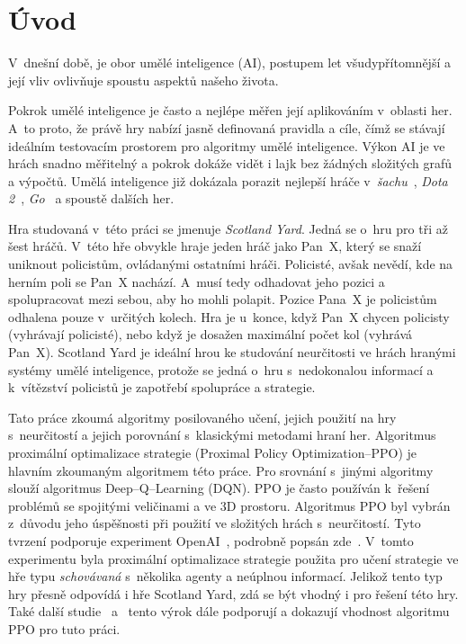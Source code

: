 \newtheorem{definition}{\textbf{Definice}}

\chapter{Úvod}
\label{ch:uvod}

V~dnešní době, je obor umělé inteligence (AI), postupem let všudypřítomnější a její vliv ovlivňuje spoustu aspektů našeho života.

Pokrok umělé inteligence je často a nejlépe měřen její aplikováním v~oblasti her.
A~to proto, že právě hry nabízí jasně definovaná pravidla a cíle, čímž se stávají ideálním testovacím prostorem pro algoritmy umělé inteligence.
Výkon AI je ve hrách snadno měřitelný a pokrok dokáže vidět i lajk bez žádných složitých grafů a výpočtů.
Umělá inteligence již dokázala porazit nejlepší hráče v~\textit{šachu}~\cite{DeepBlue}, \textit{Dota 2}~\cite{Dota2}, \textit{Go}~\cite{AlphaGo} a spoustě dalších her.

Hra studovaná v~této práci se jmenuje \emph{Scotland Yard}.
Jedná se o~hru pro tři až šest hráčů.
V~této hře obvykle hraje jeden hráč jako Pan~X, který se snaží uniknout policistům, ovládanými ostatními hráči.
Policisté, avšak nevědí, kde na herním poli se Pan~X nachází.
A~musí tedy odhadovat jeho pozici a spolupracovat mezi sebou, aby ho mohli polapit.
Pozice Pana~X je policistům odhalena pouze v~určitých kolech.
Hra je u~konce, když Pan~X chycen policisty (vyhrávají policisté), nebo když je dosažen maximální počet kol (vyhrává Pan~X).
Scotland Yard je ideální hrou ke studování neurčitosti ve hrách hranými systémy umělé inteligence, protože se jedná o~hru s~nedokonalou informací a k~vítězství policistů je zapotřebí spolupráce a strategie.

Tato práce zkoumá algoritmy posilovaného učení, jejich použití na hry s~neurčitostí a jejich porovnání s~klasickými metodami hraní her.
Algoritmus proximální optimalizace strategie (Proximal Policy Optimization--PPO) je hlavním zkoumaným algoritmem této práce.
Pro srovnání s~jinými algoritmy slouží algoritmus Deep--Q--Learning (DQN).
PPO je často používán k~řešení problémů se spojitými veličinami a ve 3D prostoru.
Algoritmus PPO byl vybrán z~důvodu jeho úspěšnosti při použití ve složitých hrách s~neurčitostí.
Tyto tvrzení podporuje experiment OpenAI~\cite{PPO_Hide_Seek_page}, podrobně popsán zde~\cite{PPO_Hide_Seek_paper}.
V~tomto experimentu byla proximální optimalizace strategie použita pro učení strategie ve hře typu \textit{schovávaná} s~několika agenty a neúplnou informací.
Jelikož tento typ hry přesně odpovídá i hře Scotland Yard, zdá se být vhodný i pro řešení této hry.
Také další studie~\cite{Manille} a~\cite{Dota2} tento výrok dále podporují a dokazují vhodnost algoritmu PPO pro tuto práci.

